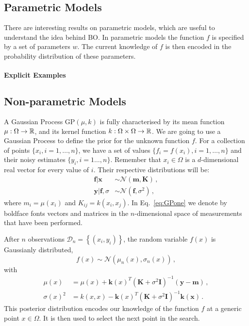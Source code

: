\subsection{Parametric Models}
\label{sec:BaysParMod}

There are interesting results on parametric models, which are useful to
understand the idea behind BO. In parametric models the function $f$ is
specified by a set of parameters $w$. The current knowledge of $f$ is then
encoded in the probability distribution of these parameters. 

\paragraph[]{Explicit Examples}

\subsection{Non-parametric Models}
\label{sec:BaysNonParMod}

A Gaussian Process $\mathrm{GP}(\mu, k)$ is fully characterised by its mean
function $\mu: \Omega\to \mathbb{R}$, and its kernel function $k: \Omega \times \Omega
\to \mathbb{R}$. We are going to use a Gaussian Process to define the prior for the
unknown function $f$. For a collection of points $\{x_i, i=1,\ldots,n\}$, we
have a set of values $\{f_i=f(x_i), i=1,\ldots,n\}$ and their noisy estimates
$\{y_i, i=1\ldots, n\}$. Remember that $x_i\in\Omega$ is a $d$-dimensional real
vector for every value of $i$. Their respective distributions will be: 
\begin{align}
    \label{eq:GPone}
    \mathbf{f}|\mathbf{x} &\sim 
        \mathcal{N}\left(\mathbf{m},\mathbf{K}\right)\, ,\\
    \mathbf{y}|\mathbf{f},\sigma &\sim 
        \mathcal{N}\left(\mathbf{f},\sigma^2\right)\, ,
\end{align}
where $m_i=\mu(x_i)$ and $K_{ij}=k(x_i,x_j)$. In Eq.~\eqref{eq:GPone} we denote
by boldface fonts vectors and matrices in the $n$-dimensional space of
measurements that have been performed. 

After $n$ observations $\mathcal{D}_n=\left\{\left(x_i,y_i\right)\right\}$, the random variable $f(x)$ is Gaussianly distributed, 
\begin{equation}
    \label{eq:PostGaussF}
    f(x)\sim \mathcal{N}\left(\mu_n(x),\sigma_n(x)\right)\, ,
\end{equation}
with
\begin{align}
    \label{eq:PostParams}
    \mu(x) &= \mu(x) + \mathbf{k}(x)^T \left(\mathbf{K} + \sigma^2 \mathbf{I}\right)^{-1} \left(\mathbf{y}-\mathbf{m}\right)\, , \\
    \sigma(x)^2 &= k(x,x) - \mathbf{k}(x)^T \left(\mathbf{K} + \sigma^2 \mathbf{I}\right)^{-1} \mathbf{k}(\mathbf{x})\, .
\end{align}
This posterior distribution encodes our knowledge of the function $f$ at a
generic point $x\in\Omega$. It is then used to select the next point in the
search. 

